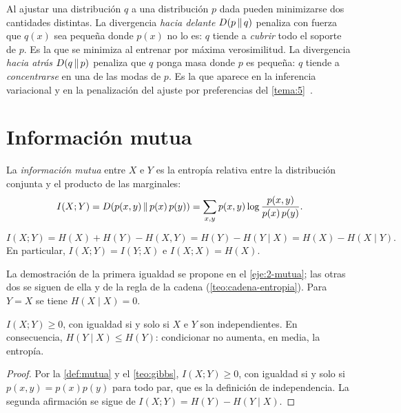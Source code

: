 \begin{observacion}\label{obs:direcciones}
Al ajustar una distribución $q$ a una distribución $p$ dada pueden minimizarse dos cantidades distintas. La divergencia \emph{hacia delante} $D(p\,\|\,q)$ penaliza con fuerza que $q(x)$ sea pequeña donde $p(x)$ no lo es: $q$ tiende a \emph{cubrir} todo el soporte de $p$. Es la que se minimiza al entrenar por máxima verosimilitud. La divergencia \emph{hacia atrás} $D(q\,\|\,p)$ penaliza que $q$ ponga masa donde $p$ es pequeña: $q$ tiende a \emph{concentrarse} en una de las modas de $p$. Es la que aparece en la inferencia variacional y en la penalización del ajuste por preferencias del \cref{tema:5}~\cite{camit}.
\end{observacion}

\section{Información mutua}

\begin{definicion}\label{def:mutua}
La \emph{información mutua} entre $X$ e $Y$ es la entropía relativa entre la distribución conjunta y el producto de las marginales:
\[
I(X;Y)=D(p(x,y)\,\|\,p(x)\,p(y))=\sum_{x,y}p(x,y)\log\frac{p(x,y)}{p(x)\,p(y)}.
\]
\end{definicion}

\begin{proposicion}\label{prop:mutua-identidades}
\[
I(X;Y)=H(X)+H(Y)-H(X,Y)=H(Y)-H(Y\mid X)=H(X)-H(X\mid Y).
\]
En particular, $I(X;Y)=I(Y;X)$ e $I(X;X)=H(X)$.
\end{proposicion}

La demostración de la primera igualdad se propone en el \cref{eje:2-mutua}; las otras dos se siguen de ella y de la regla de la cadena (\cref{teo:cadena-entropia}). Para $Y=X$ se tiene $H(X\mid X)=0$.

\begin{teorema}\label{teo:mutua-positiva}
$I(X;Y)\ge 0$, con igualdad si y solo si $X$ e $Y$ son independientes. En consecuencia, $H(Y\mid X)\le H(Y)$: condicionar no aumenta, en media, la entropía.
\end{teorema}

\begin{proof}
Por la \cref{def:mutua} y el \cref{teo:gibbs}, $I(X;Y)\ge 0$, con igualdad si y solo si $p(x,y)=p(x)p(y)$ para todo par, que es la definición de independencia. La segunda afirmación se sigue de $I(X;Y)=H(Y)-H(Y\mid X)$.
\end{proof}

